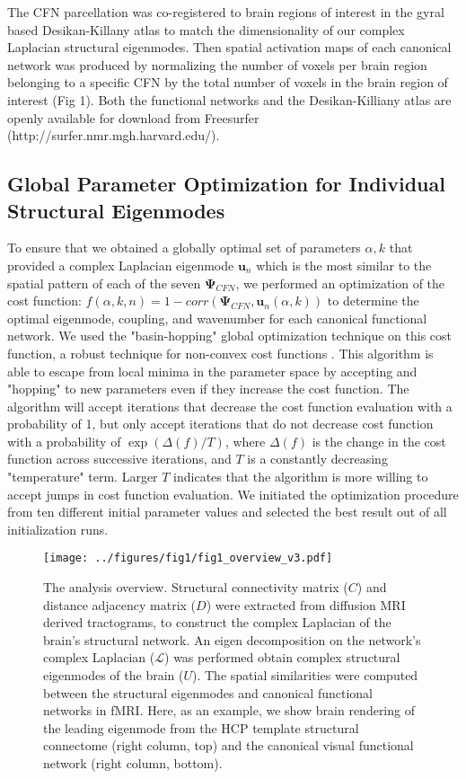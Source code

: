 \documentclass{article}
\begin{document}
The CFN parcellation was co-registered to brain regions of interest in the gyral based Desikan-Killany atlas \cite{Desikan2006} to match the dimensionality of our complex Laplacian structural eigenmodes. Then spatial activation maps of each canonical network was produced by normalizing the number of voxels per brain region belonging to a specific CFN by the total number of voxels in the brain region of interest (Fig 1). Both the functional networks and the Desikan-Killiany atlas are openly available for download from Freesurfer \cite{Fischl2012} (http://surfer.nmr.mgh.harvard.edu/).

\subsection{Global Parameter Optimization for Individual Structural Eigenmodes}
To ensure that we obtained a globally optimal set of parameters ${\alpha, k}$ that provided a complex Laplacian eigenmode $\pmb{u}_n$ which is the most similar to the spatial pattern of each of the seven $\pmb{\Psi}_{CFN}$, we performed
an optimization of the cost function: $f(\alpha,k,n) = 1- corr(\pmb{\Psi}_{CFN}, \pmb{u}_n(\alpha, k))$ to determine the optimal eigenmode, coupling, and wavenumber for each canonical functional network. We used the "basin-hopping" global optimization technique on this cost function, a robust technique for non-convex cost functions \cite{Wales1997}. This algorithm is able to escape from local minima in the parameter space by accepting and "hopping" to new parameters even if they increase the cost function. The algorithm will accept iterations that decrease the cost function evaluation with a probability of 1, but only accept iterations that do not decrease cost function with a probability of $\exp(\Delta (f)/{T})$, where $\Delta(f)$ is the change in the cost function across successive iterations, and $T$ is a constantly decreasing "temperature" term. Larger $T$ indicates that the algorithm is more willing to accept jumps in cost function evaluation. We initiated the optimization procedure from ten different initial parameter values and selected the best result out of all initialization runs.

\begin{figure}[ht!]
  \centering
  \texttt{[image: ../figures/fig1/fig1\_overview\_v3.pdf]}
  \caption{The analysis overview. Structural connectivity matrix ($C$) and distance adjacency matrix ($D$) were extracted from diffusion MRI derived tractograms, to construct the complex Laplacian of the brain's structural network. An eigen decomposition on the network's complex Laplacian ($\mathcal{L}$) was performed obtain complex structural eigenmodes of the brain ($U$). The spatial similarities were computed between the structural eigenmodes and canonical functional networks in fMRI. Here, as an example, we show brain rendering of the leading eigenmode from the HCP template structural connectome (right column, top) and the canonical visual functional network (right column, bottom).}
  \label{fig:fig1}
\end{figure}
\end{document}
